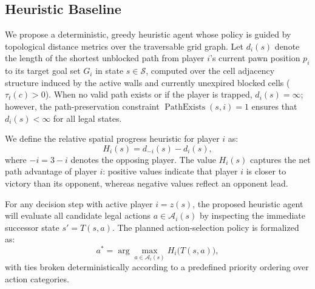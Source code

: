 \documentclass{article}
\begin{document}
\subsection{Heuristic Baseline}
\label{subsec:heuristic_baseline}

We propose a deterministic, greedy heuristic agent whose policy is guided by topological distance metrics over the traversable grid graph. Let $d_i(s)$ denote the length of the shortest unblocked path from player $i$'s current pawn position $p_i$ to its target goal set $G_i$ in state $s \in \mathcal{S}$, computed over the cell adjacency structure induced by the active walls and currently unexpired blocked cells ($\tau_t(c) > 0$). When no valid path exists or if the player is trapped, $d_i(s) = \infty$; however, the path-preservation constraint $\operatorname{PathExists}(s, i) = 1$ ensures that $d_i(s) < \infty$ for all legal states.

We define the relative spatial progress heuristic for player $i$ as:
\begin{equation}
H_i(s) = d_{-i}(s) - d_i(s),
\end{equation}
where $-i = 3 - i$ denotes the opposing player. The value $H_i(s)$ captures the net path advantage of player $i$: positive values indicate that player $i$ is closer to victory than its opponent, whereas negative values reflect an opponent lead.

For any decision step with active player $i = z(s)$, the proposed heuristic agent will evaluate all candidate legal actions $a \in \mathcal{A}_i(s)$ by inspecting the immediate successor state $s' = T(s, a)$. The planned action-selection policy is formalized as:
\begin{equation}
a^* = \arg\max_{a \in \mathcal{A}_i(s)} H_i\big(T(s, a)\big),
\end{equation}
with ties broken deterministically according to a predefined priority ordering over action categories. 
\end{document}
